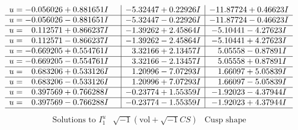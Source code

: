 \documentclass[1p]{elsarticle_modified}
\theoremstyle{definition}
\newcommand{\I}{\sqrt{-1}}
\begin{document}
$$\begin{array}{c|c|c}
\begin{aligned}
u &= -0.056026 + 0.881651 I\end{aligned}
 & -5.32447 + 0.22926 I & -11.87724 + 0.46623 I \\ \hline\begin{aligned}
u &= -0.056026 - 0.881651 I\end{aligned}
 & -5.32447 - 0.22926 I & -11.87724 - 0.46623 I \\ \hline\begin{aligned}
u &= \phantom{-}0.112571 + 0.866237 I\end{aligned}
 & -1.39262 + 2.45864 I & -5.10441 - 4.27623 I \\ \hline\begin{aligned}
u &= \phantom{-}0.112571 - 0.866237 I\end{aligned}
 & -1.39262 - 2.45864 I & -5.10441 + 4.27623 I \\ \hline\begin{aligned}
u &= -0.669205 + 0.554761 I\end{aligned}
 & \phantom{-}3.32166 + 2.13457 I & \phantom{-}5.05558 - 0.87891 I \\ \hline\begin{aligned}
u &= -0.669205 - 0.554761 I\end{aligned}
 & \phantom{-}3.32166 - 2.13457 I & \phantom{-}5.05558 + 0.87891 I \\ \hline\begin{aligned}
u &= \phantom{-}0.683206 + 0.533126 I\end{aligned}
 & \phantom{-}1.20996 - 7.07293 I & \phantom{-}1.66097 + 5.05839 I \\ \hline\begin{aligned}
u &= \phantom{-}0.683206 - 0.533126 I\end{aligned}
 & \phantom{-}1.20996 + 7.07293 I & \phantom{-}1.66097 - 5.05839 I \\ \hline\begin{aligned}
u &= \phantom{-}0.397569 + 0.766288 I\end{aligned}
 & -0.23774 + 1.55359 I & -1.92023 - 4.37944 I \\ \hline\begin{aligned}
u &= \phantom{-}0.397569 - 0.766288 I\end{aligned}
 & -0.23774 - 1.55359 I & -1.92023 + 4.37944 I\\
 \hline 
 \end{array}$$\newpage$$\begin{array}{c|c|c}  
\text{Solutions to }I^u_{1}& \I (\text{vol} + \sqrt{-1}CS) & \text{Cusp shape}\\

\end{array}$$
\end{document}
